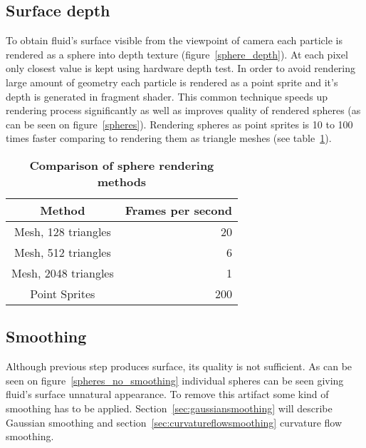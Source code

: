 \subsection{Surface depth} \label{sec:surfacedepth}
To obtain fluid's surface visible from the viewpoint of camera each particle is rendered as a sphere into depth texture (figure~\ref{sphere_depth}). At each pixel only closest value is kept using hardware depth test. 
In order to avoid rendering large amount of geometry each particle is rendered as a point sprite and it's depth is generated in fragment shader. This common technique speeds up rendering process significantly as well as improves quality of rendered spheres (as can be seen on figure~\ref{spheres}). Rendering spheres as point sprites is 10 to 100 times faster comparing to rendering them as triangle meshes (see table~\ref{sphere_speed_comp}).
\begin{table}[htdp]
\caption[Comparision of sphere rendering methods]{\textbf{Comparison of sphere rendering methods}}
\centering
\begin{tabular}{cr} 
{\bf Method} & {\bf Frames per second} \\ 
\hline 
Mesh, 128 triangles & 20 \\
Mesh, 512 triangles & 6 \\
Mesh, 2048 triangles   & 1 \\
Point Sprites & 200 \\
\end{tabular}
\label{sphere_speed_comp}
\end{table}

\subsection{Smoothing} 
\label{sec:smoothing}
Although previous step produces surface, its quality is not sufficient. As can be seen on figure~\ref{spheres_no_smoothing} individual spheres can be seen giving fluid's surface unnatural appearance. To remove this artifact some kind of smoothing has to be applied. Section~\ref{sec:gaussiansmoothing} will describe Gaussian smoothing and section~\ref{sec:curvatureflowsmoothing} curvature flow smoothing.

